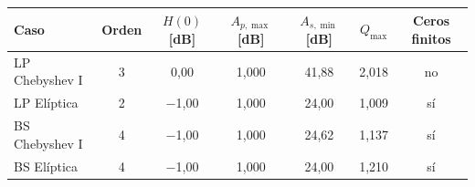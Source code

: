 \begin{tabular}{@{}lcccccc@{}}
\toprule
Caso & Orden & $H(0)$ [dB] & $A_{p,\max}$ [dB] & $A_{s,\min}$ [dB] & $Q_{\max}$ & Ceros finitos \\
\midrule
LP Chebyshev I & 3 & 0{,}00 & 1{,}000 & 41{,}88 & 2{,}018 & no \\
LP Elíptica & 2 & $-$1{,}00 & 1{,}000 & 24{,}00 & 1{,}009 & sí \\
BS Chebyshev I & 4 & $-$1{,}00 & 1{,}000 & 24{,}62 & 1{,}137 & sí \\
BS Elíptica & 4 & $-$1{,}00 & 1{,}000 & 24{,}00 & 1{,}210 & sí \\
\bottomrule
\end{tabular}